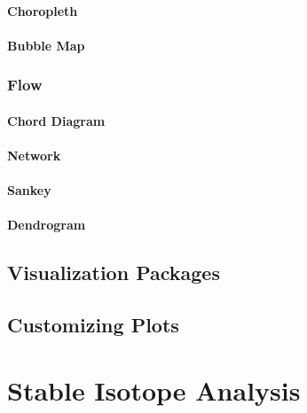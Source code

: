 \documentclass[
  letterpaper,
  DIV=11,
  numbers=noendperiod]{scrreprt}
\begin{document}
\subsection*{Choropleth}\label{choropleth}

\subsection*{Bubble Map}\label{bubble-map}

\section*{Flow}\label{flow}


\subsection*{Chord Diagram}\label{chord-diagram}

\subsection*{Network}\label{network}

\subsection*{Sankey}\label{sankey}

\subsection*{Dendrogram}\label{dendrogram}

\chapter{Visualization Packages}\label{visualization-packages}

\chapter{Customizing Plots}\label{customizing-plots}

\part{Stable Isotope Analysis}
\end{document}
